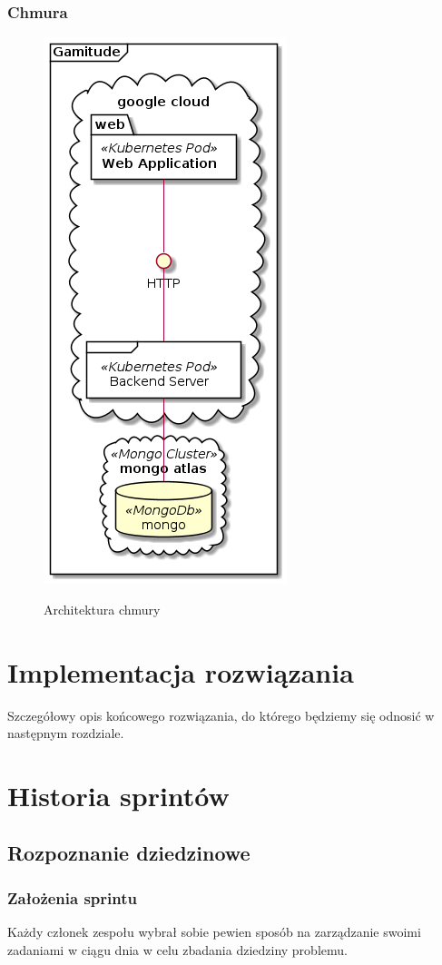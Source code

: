 \documentclass[a4paper,11pt]{report}
\begin{document}
\subsection{Chmura}
\begin{figure}[h]
	\centering
	\includegraphics[scale=0.5]{gamitude_cloud_overview}\\
	\caption{Architektura chmury}
	\label{fig:db}
\end{figure}
\chapter {Implementacja rozwiązania}
Szczegółowy opis końcowego rozwiązania, do którego będziemy się odnosić w następnym rozdziale.

\chapter {Historia sprintów}
\section {Rozpoznanie dziedzinowe}
\subsection {Założenia sprintu}
Każdy członek zespołu wybrał sobie pewien sposób na zarządzanie swoimi zadaniami w ciągu dnia w celu zbadania dziedziny problemu.
\end{document}
